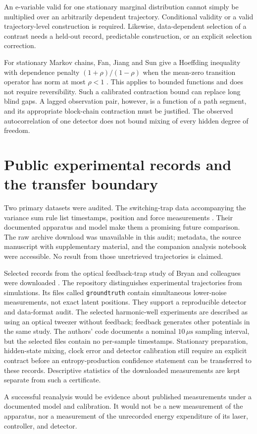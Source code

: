 An e-variable valid for one stationary marginal distribution cannot simply be
multiplied over an arbitrarily dependent trajectory. Conditional validity or
a valid trajectory-level construction is required. Likewise, data-dependent
selection of a contrast needs a held-out record, predictable construction, or
an explicit selection correction.

For stationary Markov chains, Fan, Jiang and Sun give a Hoeffding inequality
with dependence penalty $(1+\rho)/(1-\rho)$ when the mean-zero transition
operator has norm at most $\rho<1$ \cite{ciFan2021}. This applies to bounded
functions and does not require reversibility. Such a calibrated contraction
bound can replace long blind gaps. A lagged observation pair, however, is a
function of a path segment, and its appropriate block-chain contraction must
be justified. The observed autocorrelation of one detector does not bound
mixing of every hidden degree of freedom.

\section{Public experimental records and the transfer boundary}

Two primary datasets were audited. The switching-trap data accompanying the
variance sum rule list timestamps, position and force measurements
\cite{ciVSRData2024}. Their documented apparatus and model make them a
promising future comparison. The raw archive download was unavailable in
this audit; metadata, the source manuscript with supplementary material, and
the companion analysis notebook were accessible. No result from those
unretrieved trajectories is claimed.

Selected records from the optical feedback-trap study of Bryan and colleagues
were downloaded \cite{ciBryan2022,ciBryanData2022}. The repository distinguishes
experimental trajectories from simulations. Its files called
\texttt{groundtruth} contain simultaneous lower-noise measurements, not exact
latent positions. They support a reproducible detector and data-format audit.
The selected harmonic-well experiments are described as using an optical
tweezer without feedback; feedback generates other potentials in the same
study. The authors' code documents a nominal $10\,\mu\mathrm{s}$ sampling
interval, but the selected files contain no per-sample timestamps.
Stationary preparation, hidden-state mixing, clock error and detector
calibration still require an explicit contract before an entropy-production
confidence statement can be transferred to these records. Descriptive
statistics of the downloaded measurements are kept separate from such a
certificate.

A successful reanalysis would be evidence about published measurements under
a documented model and calibration. It would not be a new measurement of the
apparatus, nor a measurement of the unrecorded energy expenditure of its
laser, controller, and detector.
